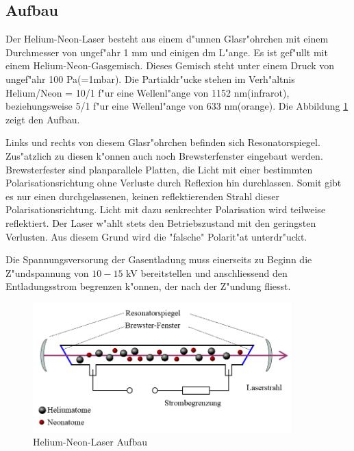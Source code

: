 \begin{refsection}
\subsection{Aufbau}
\label{He-Ne-Laser Aufbau}
Der Helium-Neon-Laser besteht aus einem d"unnen Glasr"ohrchen mit einem 
Durchmesser von ungef"ahr 1 mm und einigen dm L"ange. Es ist gef"ullt mit 
einem Helium-Neon-Gasgemisch. 
Dieses Gemisch steht unter einem Druck von ungef"ahr 100 Pa(=1mbar).
Die Partialdr"ucke stehen im Verh"altnis Helium/Neon = 10/1 f"ur eine 
Wellenl"ange von 1152 nm(infrarot),
beziehungsweise 5/1 f"ur eine Wellenl"ange von 633 nm(orange).
Die Abbildung \ref{HeNeLaserschema} zeigt den Aufbau.

Links und rechts von diesem Glasr"ohrchen befinden sich Resonatorspiegel.
Zus"atzlich zu diesen k"onnen auch noch Brewsterfenster eingebaut werden.
Brewsterfester sind planparallele Platten, die Licht mit einer bestimmten 
Polarisationsrichtung ohne Verluste durch Reflexion hin durchlassen. Somit 
gibt es nur einen durchgelassenen, keinen reflektierenden Strahl dieser 
Polarisationsrichtung. Licht mit dazu senkrechter Polarisation wird teilweise 
reflektiert.
Der Laser w"ahlt stets den Betriebszustand mit den geringsten Verlusten. Aus 
diesem Grund wird die "falsche" Polarit"at unterdr"uckt.

Die Spannungsversorung der Gasentladung muss einerseits zu Beginn die 
Z"undspannung von $10 - 15$ kV bereitstellen und anschliessend den 
Entladungsstrom begrenzen k"onnen, der nach der Z"undung fliesst.

\begin{figure}
\centering
\includegraphics[width = 10cm]{laser/bilder/Laserschema.png}
\caption{Helium-Neon-Laser Aufbau \cite{He-Ne-Laser-Aufbau}}
\label{HeNeLaserschema}
\end{figure}



\end{refsection}
